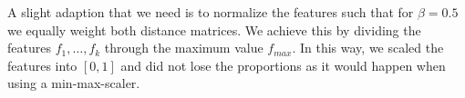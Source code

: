 A slight adaption that we need is to normalize the features such that for $\beta = 0.5$ we equally weight both distance matrices. We achieve this by dividing the features $f_1, \dots, f_k$ through the maximum value $f_{max}$. In this way, we scaled the features into $[0,1]$ and did not lose the proportions as it would happen when using a min-max-scaler.
